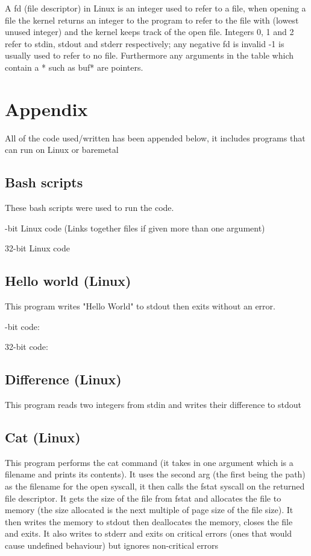 \documentclass{article}
\newcommand{\layout}[1]{\parbox{\linewidth}{#1}}
\begin{document}
\setlength{\tabcolsep}{6pt}

\layout{
  A fd (file descriptor) in Linux is an integer used to refer to a file, when opening a file the kernel returns an integer to the program to refer to the file with (lowest unused integer) and the kernel keeps track of the open file.
  Integers 0, 1 and 2 refer to stdin, stdout and stderr respectively; any negative fd is invalid -1 is usually used to refer to no file\cite{unix-fd}.
  Furthermore any arguments in the table which contain a * such as buf* are pointers.
}

\section{Appendix}
All of the code used/written has been appended below, it includes programs that can run on Linux or baremetal

\subsection{Bash scripts}
These bash scripts were used to run the code.

\noindent {}-bit Linux code (Links together files if given more than one argument)

32-bit Linux code


\subsection{Hello world (Linux)}
This program writes "Hello World" to stdout then exits without an error.

\noindent {}-bit code:

32-bit code:


\subsection{Difference (Linux)}
This program reads two integers from stdin and writes their difference to stdout



\subsection{Cat (Linux)}
This program performs the cat command (it takes in one argument which is a filename and prints its contents). It uses the second arg (the first being the path) as the filename for the open syscall, it then calls the fstat syscall on the returned file descriptor. It gets the size of the file from fstat and allocates the file to memory (the size allocated is the next multiple of page size of the file size). It then writes the memory to stdout then deallocates the memory, closes the file and exits. It also writes to stderr and exits on critical errors (ones that would cause undefined behaviour) but ignores non-critical errors
\end{document}
